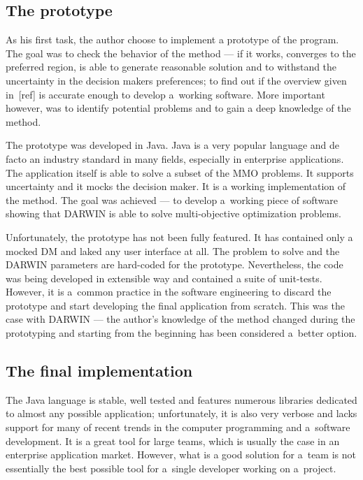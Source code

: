 \subsection{The prototype}

As his first task, the author choose to implement a prototype of the
program. The goal was to check the behavior of the method --- if it works,
converges to the preferred region, is able to generate reasonable solution and
to withstand the uncertainty in the decision makers preferences; to find out
if the overview given in~[ref] is accurate enough to develop a~working
software. More important however, was to identify potential problems and to
gain a deep knowledge of the method.

The prototype was developed in Java. Java is a very popular language and de
facto an industry standard in many fields, especially in enterprise
applications. The application itself is able to solve a subset of the MMO
problems. It supports uncertainty and it mocks the decision maker. It is a
working implementation of the method. The goal was achieved --- to develop
a~working piece of software showing that DARWIN is able to solve
multi-objective optimization problems. 

Unfortunately, the prototype has not been fully featured. It has contained
only a mocked DM and laked any user interface at all. The problem to solve and
the DARWIN parameters are hard-coded for the prototype. Nevertheless, the code
was being developed in extensible way and contained a suite of
unit-tests. However, it is a~common practice in the software engineering to
discard the prototype and start developing the final application from scratch.
This was the case with DARWIN --- the author's knowledge of the method changed
during the prototyping and starting from the beginning has been considered
a~better option.

\subsection{The final implementation}
The Java language is stable, well tested and features numerous libraries
dedicated to almost any possible application; unfortunately, it is also very
verbose and lacks support for many of recent trends in the computer
programming and a~software development. It is a great tool for large teams,
which is usually the case in an enterprise application market. However, what
is a good solution for a~team is not essentially the best possible tool for
a~single developer working on a~project.

